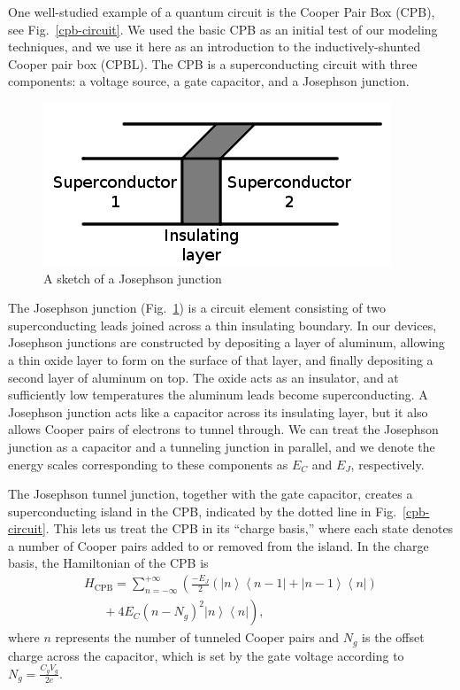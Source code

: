 \documentclass[twocolumn]{revtex4}
\newcommand{\bra}[1]{\left< #1 \right|}
\newcommand{\ket}[1]{\left| #1 \right>}
\begin{document}
One well-studied example of a quantum circuit is the Cooper Pair Box
(CPB)\cite{Nakamura,Vion}, see Fig.~\ref{cpb-circuit}. We used
the basic CPB as an initial test of our modeling techniques, and we
use it here as an introduction to the inductively-shunted Cooper pair
box (CPBL). The CPB is a superconducting circuit with three
components: a voltage source, a gate capacitor, and a Josephson
junction.

\begin{figure}
  \includegraphics[width=.66\linewidth]{junction.png}
  \caption{ A sketch of a Josephson junction }
  \label{junction}
\end{figure}

The Josephson junction (Fig.~\ref{junction}) is a circuit element
consisting of two superconducting leads joined across a thin
insulating boundary. In our devices, Josephson junctions are
constructed by depositing a layer of aluminum, allowing a thin oxide
layer to form on the surface of that layer, and finally depositing a
second layer of aluminum on top. The oxide acts as an insulator, and
at sufficiently low temperatures the aluminum leads become
superconducting. A Josephson junction acts like a capacitor across its
insulating layer, but it also allows Cooper pairs of electrons to
tunnel through. We can treat the Josephson junction as a capacitor and
a tunneling junction in parallel, and we denote the energy scales
corresponding to these components as $E_C$ and $E_J$, respectively.

The Josephson tunnel junction, together with the gate capacitor,
creates a superconducting island in the CPB, indicated by the dotted
line in Fig.~\ref{cpb-circuit}. This lets us treat the CPB in its
``charge basis,'' where each state denotes a number of Cooper pairs
added to or removed from the island. In the charge basis, the
Hamiltonian of the CPB is
\begin{multline}
\label{cpb-H}
  H_{\text{CPB}} = \sum_{n=-\infty}^{+\infty} \left(\frac{-E_J}{2}\left(
      \ket{n}\bra{n-1} + \ket{n-1}\bra{n} \right)\right. \\
  \left.\phantom{\frac{-E_J}{2}} + 4E_C(n-N_g)^2\ket{n}\bra{n}\right),
\end{multline}
where $n$ represents the number of tunneled Cooper pairs and $N_g$ is
the offset charge across the capacitor, which is set by the gate
voltage according to $N_g=\frac{C_gV_g}{2e}$.
\end{document}
